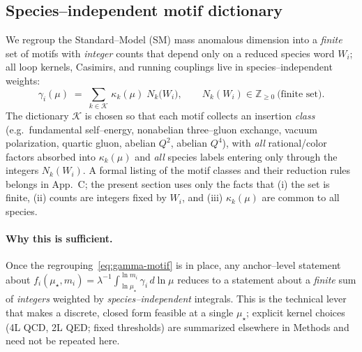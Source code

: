 \documentclass[epjc3]{svjour3}
\begin{document}
\subsection{Species--independent motif dictionary}\label{sec:motif-dict}
We regroup the Standard--Model (SM) mass anomalous dimension into a \emph{finite} set of motifs with \emph{integer} counts that depend only on a reduced species word $W_i$; all loop kernels, Casimirs, and running couplings live in species--independent weights:
\begin{equation}
  \gamma_i(\mu)\;=\;\sum_{k\in\mathcal K}\,\kappa_k(\mu)\;N_k\!\bigl(W_i\bigr),
  \qquad N_k(W_i)\in\mathbb Z_{\ge0}\ \text{(finite set)}.
  \label{eq:gamma-motif}
\end{equation}
The dictionary $\mathcal K$ is chosen so that each motif collects an insertion \emph{class} (e.g.\ fundamental self--energy, nonabelian three--gluon exchange, vacuum polarization, quartic gluon, abelian $Q^2$, abelian $Q^4$), with \emph{all} rational/color factors absorbed into $\kappa_k(\mu)$ and \emph{all} species labels entering only through the integers $N_k(W_i)$. A formal listing of the motif classes and their reduction rules belongs in App.~C; the present section uses only the facts that (i) the set is finite, (ii) counts are integers fixed by $W_i$, and (iii) $\kappa_k(\mu)$ are common to all species. %

\paragraph{Why this is sufficient.}
Once the regrouping~\eqref{eq:gamma-motif} is in place, any anchor--level statement about $f_i(\mu_\star,m_i)=\lambda^{-1}\!\int_{\ln\mu_\star}^{\ln m_i}\gamma_i\,d\ln\mu$ reduces to a statement about a \emph{finite} sum of \emph{integers} weighted by \emph{species--independent} integrals. This is the technical lever that makes a discrete, closed form feasible at a single $\mu_\star$; explicit kernel choices (4L QCD, 2L QED; fixed thresholds) are summarized elsewhere in Methods and need not be repeated here. %
\end{document}
